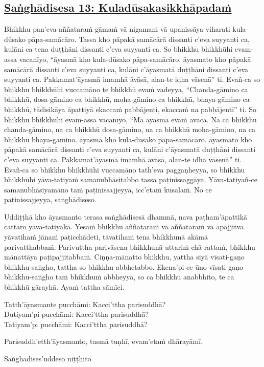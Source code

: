 \subsection*{\hyperref[comm13]{Saṅghādisesa 13: Kuladūsakasikkhāpadaṁ}}
\label{sd13}
Bhikkhu pan’eva aññataraṁ gāmaṁ vā nigamaṁ vā upanissāya viharati kula-dūsako pāpa-samācāro. Tassa kho pāpakā samācārā dissanti c’eva suyyanti ca, kulāni ca tena duṭṭhāni dissanti c’eva suyyanti ca. So bhikkhu bhikkhūhi evam-assa vacanīyo, “āyasmā kho kula-dūsako pāpa-samācāro. āyasmato kho pāpakā samācārā dissanti c’eva suyyanti ca, kulāni c’āyasmatā duṭṭhāni dissanti c’eva suyyanti ca. Pakkamat’āyasmā imamhā āvāsā, alan-te idha vāsenā” ti. Evañ-ca so bhikkhu bhikkhūhi vuccamāno te bhikkhū evaṁ vadeyya, “Chanda-gāmino ca bhikkhū, dosa-gāmino ca bhikkhū, moha-gāmino ca bhikkhū, bhaya-gāmino ca bhikkhū, tādisikāya āpattiyā ekaccaṁ pabbājenti, ekaccaṁ na pabbājentī” ti. So bhikkhu bhikkhūhi evam-assa vacanīyo, “Mā āyasmā evaṁ avaca. Na ca bhikkhū chanda-gāmino, na ca bhikkhū dosa-gāmino, na ca bhikkhū moha-gāmino, na ca bhikkhū bhaya-gāmino. āyasmā kho kula-dūsako pāpa-samācāro. āyasmato kho pāpakā samācārā dissanti c’eva suyyanti ca, kulāni c’āyasmatā duṭṭhāni dissanti c’eva suyyanti ca. Pakkamat’āyasmā imamhā āvāsā, alan-te idha vāsenā” ti. Evañ-ca so bhikkhu bhikkhūhi vuccamāno tath’eva paggaṇheyya, so bhikkhu bhikkhūhi yāva-tatiyaṁ samanubhāsitabbo tassa paṭinissaggāya. Yāva-tatiyañ-ce samanubhāsiyamāno taṁ paṭinissajjeyya, icc’etaṁ kusalaṁ. No ce paṭinissajjeyya, saṅghādiseso.

\medskip

\begin{center}
Uddiṭṭhā kho āyasmanto terasa saṅghādisesā dhammā, nava paṭham’āpattikā cattāro yāva-tatiyakā. Yesaṁ bhikkhu aññataraṁ vā aññataraṁ vā āpajjitvā yāvatihaṁ jānaṁ paṭicchādeti, tāvatihaṁ tena bhikkhunā akāmā parivatthabbaṁ. Parivuttha-parivāsena bhikkhunā uttariṁ chā-rattaṁ, bhikkhu-mānattāya paṭipajjitabbaṁ. Ciṇṇa-mānatto bhikkhu, yattha siyā vīsati-gaṇo bhikkhu-saṅgho, tattha so bhikkhu abbhetabbo. Ekena'pi ce ūno vīsati-gaṇo bhikkhu-saṅgho taṁ bhikkhuṁ abbheyya, so ca bhikkhu anabbhito, te ca bhikkhū gārayhā. Ayaṁ tattha sāmīci.

\smallskip

Tatth'āyasmante pucchāmi: Kacci'ttha parisuddhā?\\
Dutiyam'pi pucchāmi: Kacci'ttha parisuddhā?\\
Tatiyam'pi pucchāmi: Kacci'ttha parisuddhā?

\smallskip

Parisuddh'etth'āyasmanto, tasmā tuṇhī, evam'etaṁ dhārayāmī.
\end{center}

\begin{outro}
  Saṅghādises’uddeso niṭṭhito
\end{outro}

\clearpage
